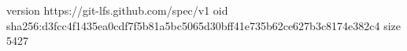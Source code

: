 version https://git-lfs.github.com/spec/v1
oid sha256:d3fcc4f1435ea0cdf7f5b81a5bc5065d30bff41e735b62ce627b3c8174e382c4
size 5427
